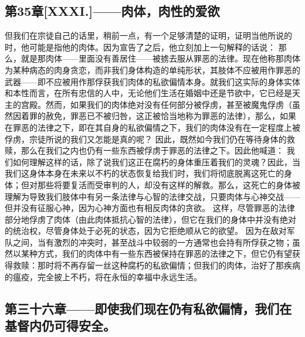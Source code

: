 
\subsection{第35章[XXXI.]——肉体，肉性的爱欲}

但我们在宗徒自己的话里，稍前一点，有一个足够清楚的证明，证明当他所说的时，他可能是指他的肉体。因为宣告了之后，他立刻加上一句解释的话说：  那么，就是那肉体——里面没有善居住——被掳去服从罪恶的法律。现在他称那肉体为某种病态的肉身贪恋，而非我们身体构造的单纯形状，其肢体不应被用作罪恶的武器——即不应被用作那俘获我们肉体的私欲偏情本身。就我们这实际的身体实体和本性而言，在所有忠信的人中，无论他们生活在婚姻中还是节欲中，它已经是天主的宫殿。然而，如果我们的肉体绝对没有任何部分被俘虏，甚至被魔鬼俘虏（虽然因着罪的赦免，罪恶已不被归咎，这正被恰当地称为罪恶的法律），那么，如果在罪恶的法律之下，即在其自身的私欲偏情之下，我们的肉体没有在一定程度上被俘虏，宗徒所说的我们又怎能是真的呢？  因此，既然如今我们仍在等待身体的救赎，那么在我们之内也仍有一些东西被俘虏于罪恶的法律之下。因此他喊道：  我们如何理解这样的话，除了说我们这正在腐朽的身体重压着我们的灵魂？因此，当我们这身体本身在未来以不朽的状态恢复给我们时，我们将彻底脱离这死亡的身体；但对那些将要复活而受审判的人，却没有这样的解救。那么，这死亡的身体被理解为导致我们肢体中有另一条法律与心智的法律交战，只要肉体与心神交战——但并没有征服心神，因为心神方面也有相反肉体的贪欲。  这样，尽管罪恶的法律部分地俘虏了肉体（由此肉体抵抗心智的法律），但它在我们的身体中并没有绝对的统治权，尽管身体处于必死的状态，因为它拒绝顺从它的欲望。  因为在敌对军队之间，当有激烈的冲突时，甚至战斗中较弱的一方通常也会持有所俘获之物；虽然以某种方式，我们的肉体中有一些东西被保持在罪恶的法律之下，但它仍有望获得救赎：那时将不再存留一丝这种腐朽的私欲偏情；但我们的肉体，治好了那疾病的瘟疫，完全披上不朽，将在永恒的幸福中永远生活。\par


\subsection{第三十六章——即使我们现在仍有私欲偏情，我们在基督内仍可得安全。}

